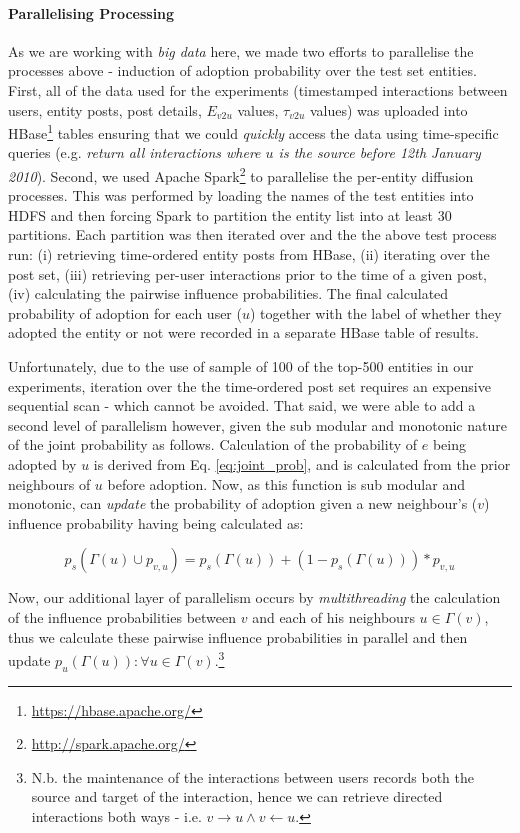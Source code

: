 \documentclass[journal,10pt,draftclsnofoot,onecolumn]{IEEEtran}
\begin{document}
\paragraph{Parallelising Processing}
As we are working with \emph{big data} here, we made two efforts to parallelise the processes above - induction of adoption probability over the test set entities.
First, all of the data used for the experiments (timestamped interactions between users, entity posts, post details, $E_{v2u}$ values, $\tau_{v2u}$ values) was uploaded into HBase\footnote{\url{https://hbase.apache.org/}} tables ensuring that we could \emph{quickly} access the data using time-specific queries (e.g. \emph{return all interactions where $u$ is the source before 12th January 2010}).
Second, we used Apache Spark\footnote{\url{http://spark.apache.org/}} to parallelise the per-entity diffusion processes.
This was performed by loading the names of the test entities into HDFS and then forcing Spark to partition the entity list into at least 30 partitions.
Each partition was then iterated over and the the above test process run: (i) retrieving time-ordered entity posts from HBase, (ii) iterating over the post set, (iii) retrieving per-user interactions prior to the time of a given post, (iv) calculating the pairwise influence probabilities.
The final calculated probability of adoption for each user ($u$) together with the label of whether they adopted the entity or not were recorded in a separate HBase table of results.

Unfortunately, due to the use of sample of 100 of the top-500 entities in our experiments, iteration over the the time-ordered post set requires an expensive sequential scan - which cannot be avoided.
That said, we were able to add a second level of parallelism however, given the sub modular and monotonic nature of the joint probability as follows.
Calculation of the probability of $e$ being adopted by $u$ is derived from Eq. \ref{eq:joint_prob}, and is calculated from the prior neighbours of $u$ before adoption.
Now, as this function is sub modular and monotonic, can \emph{update} the probability of adoption given a new neighbour's ($v$) influence probability having being calculated as:

\begin{equation}
p_s(\Gamma(u) \cup p_{v,u}) = p_s(\Gamma(u)) + (1 - p_s(\Gamma(u))) * p_{v,u}
\end{equation}

Now, our additional layer of parallelism occurs by \emph{multithreading} the calculation of the influence probabilities between $v$ and each of his neighbours $u \in \Gamma(v)$, thus we calculate these pairwise influence probabilities in parallel and then update $p_u(\Gamma(u)) : \forall u \in \Gamma(v)$.\footnote{N.b. the maintenance of the interactions between users records both the source and target of the interaction, hence we can retrieve directed interactions both ways - i.e. $v \rightarrow u \wedge v \leftarrow u$.}
\end{document}
